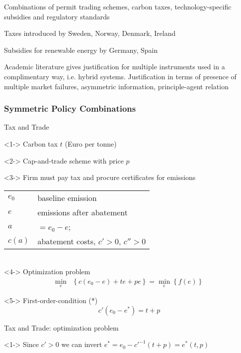 



	Combinations of permit trading schemes, carbon taxes, technology-specific subsidies and regulatory standards


	Taxes introduced by Sweden, Norway, Denmark, Ireland


	Subsidies for renewable energy by Germany, Spain


	Academic literature gives justification for multiple instruments used in a complimentary way, i.e. hybrid systems. Justification in terms of presence of multiple market failures, asymmetric information, principle-agent relation

\subsubsection{Symmetric Policy Combinations}

{Tax and Trade}






	<1-> Carbon tax $t$ (Euro per tonne)


	<2-> Cap-and-trade scheme with price $p$


	<3-> Firm must pay tax and procure certificates for emissions
\begin{tabular}{ll}
$e_0$ & baseline emission \\
$e$ & emissions after abatement \\
$a$ & $=e_0 - e$; \\
$c(a)$ & abatement costs, $c' > 0$, $c'' > 0$ \\
\end{tabular} \\


	<4-> Optimization problem
\begin{align}
\min_{e} & \left\{c(e_0-e)+te+pe\right\} = \min_{e}\left\{f(e)\right\}
\end{align}


	<5-> First-order-condition (*)
\[
c'(e_0-e^*)=t+p
\]






{Tax and Trade: optimization problem}






	<1-> Since $c'>0$ we can invert $e^*=e_0-c'^{-1}(t+p)=e^*(t,p)$ \\



